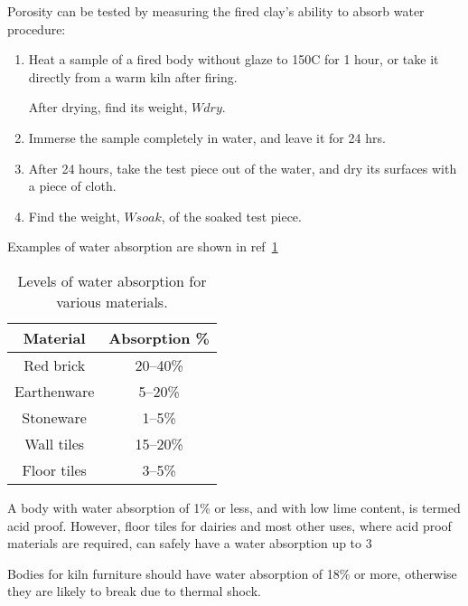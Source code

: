 Porosity can be tested by measuring the fired clay's ability to absorb water 
procedure:
\begin{enumerate}
\item Heat a sample of a fired body without glaze to 150\degree C for 1 hour, 
or take 
it directly from a warm kiln after firing.

After drying, find its weight, $Wdry$.

\item Immerse the sample completely in water, and leave it for 24 hrs.

\item After 24 hours, take the test piece out of the water, and dry its 
surfaces with a piece of cloth.

\item Find the weight, $Wsoak$, of the soaked test piece.
\end{enumerate}
Examples of water absorption are shown in ref~\ref{tab:waterabsorption}
\begin{center}
  \begin{table}\centering
    \renewcommand{\arraystretch}{1.5}    
    \begin{tabular}{|c|c|}\hline
      \textbf{Material}&\textbf{Absorption \%}\\\hline\hline
Red brick&20--40\%\\\hline
Earthenware&5--20\%\\\hline
Stoneware&1--5\%\\\hline
Wall tiles&15--20\%\\\hline
Floor tiles&3--5\%\\\hline
    \end{tabular}
    \caption{Levels of water absorption for various materials.}
    \label{tab:waterabsorption}
  \end{table}
\end{center}
A body with water absorption of 1\% or less, and with low lime content, is 
termed acid proof. However, floor tiles for dairies and most other uses, where 
acid proof materials are required, can safely have a water absorption up to 3%

Bodies for kiln furniture should have water absorption of 18\% or more, 
otherwise they are likely to break due to thermal shock.
